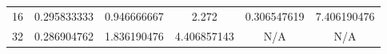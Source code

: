 \begin{center}
{\begin{tabular}{|c|c|c|c|c|c|}
16           & 0.295833333                                                             & 0.946666667                                                               & 2.272                                                                       & 0.306547619                                                             & 7.406190476                                                       \\
32           & 0.286904762                                                             & 1.836190476                                                               & 4.406857143                                                                 & N/A                                                                     & N/A                                                               \\ \hline
\end{tabular}
}

\end{center}

\vspace{0.5cm}


\noindent%
\begin{minipage}{\linewidth}%
 \label{fig:hemelb-cost-plot}%
\end{minipage}

\vspace{0.5cm}

